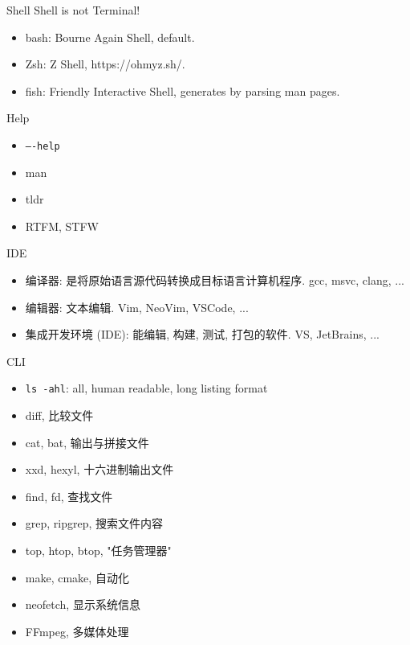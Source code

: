 \documentclass{beamer}
\begin{document}
\begin{frame}{Shell}
    Shell is not Terminal!
    \begin{itemize}
        \item bash: Bourne Again Shell, default.
        \item Zsh: Z Shell, https://ohmyz.sh/.
        \item fish: Friendly Interactive Shell, generates by parsing man pages.
    \end{itemize}
\end{frame}

\begin{frame}{Help}
    \begin{itemize}
        \item {\tt ----help}
        \item man
        \item tldr
        \item RTFM, STFW
    \end{itemize}
\end{frame}

\begin{frame}{IDE}
    \begin{itemize}
        \item 编译器: 是将原始语言源代码转换成目标语言计算机程序. gcc, msvc, clang, ...
        \item 编辑器: 文本编辑. Vim, NeoVim, VSCode, ...
        \item 集成开发环境 (IDE): 能编辑, 构建, 测试, 打包的软件. VS, JetBrains, ...
    \end{itemize}
\end{frame}

\begin{frame}{CLI}
    \begin{itemize}
        \item {\tt ls -ahl}: all, human readable, long listing format
        \item diff, 比较文件
        \item cat, bat, 输出与拼接文件
        \item xxd, hexyl, 十六进制输出文件
        \item find, fd, 查找文件
        \item grep, ripgrep, 搜索文件内容
        \item top, htop, btop, "任务管理器"
        \item make, cmake, 自动化
        \item neofetch, 显示系统信息
        \item FFmpeg, 多媒体处理
    \end{itemize}
\end{frame}
\end{document}
